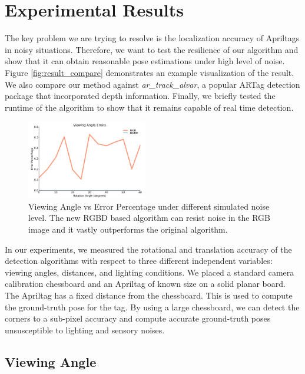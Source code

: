 \section{Experimental Results}

The key problem we are trying to resolve is the localization accuracy of Apriltags in noisy situations. Therefore, we want to test the resilience of our algorithm and show that it can obtain reasonable pose estimations under high level of noise. Figure \ref{fig:result_compare} demonstrates an example visualization of the result. We also compare our method against \textit{ar\_track\_alvar}, a popular ARTag detection package that incorporated depth information. Finally, we briefly tested the runtime of the algorithm to show that it remains capable of real time detection. 


\begin{figure}[h]
\centering
\includegraphics[width=\columnwidth, height=130px]{figs/viewing_angle_fig2}
\caption{Viewing Angle vs Error Percentage under different simulated noise level. The new RGBD based algorithm can resist noise in the RGB image and it vastly outperforms the original algorithm.}
\label{fig:viewing_result}
\end{figure}

In our experiments, we measured the rotational and translation accuracy of the detection algorithms with respect to three different independent variables: viewing angles, distances, and lighting conditions. We placed a standard camera calibration chessboard and an Apriltag of known size on a solid planar board. The Apriltag has a fixed distance from the chessboard. This is used to compute the ground-truth pose for the tag. By using a large chessboard, we can detect the corners to a sub-pixel accuracy and compute accurate ground-truth poses unsusceptible to lighting and sensory noises. 

\subsection{Viewing Angle}


